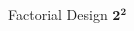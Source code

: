 \begin{frame}{Factorial Design $\pmb{2^2}$}
\begin{multicols}{2}
{\begin{figure}
\end{figure}}
\end{multicols}
\end{frame}

